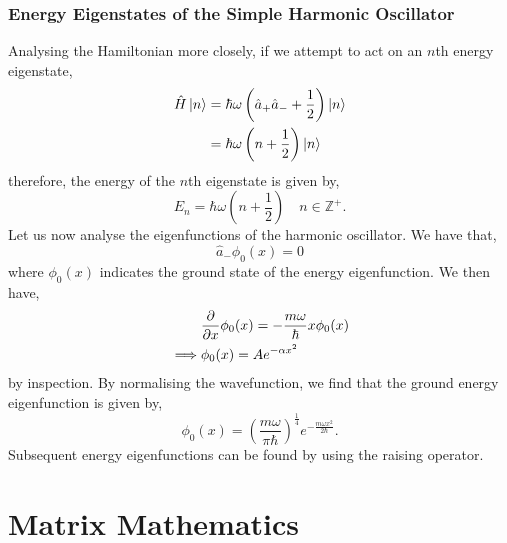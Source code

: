\documentclass{book}
\begin{document}
\subsection{Energy Eigenstates of the Simple Harmonic Oscillator}
Analysing the Hamiltonian more closely, if we attempt to act on an $n$th energy eigenstate,
\begin{equation}
	\begin{split}
	\hat{H} \ket{n} & = \hbar\omega\left(\hat{a}_+\hat{a}_- + \frac{1}{2}\right)\ket{n} \\
	& = \hbar \omega \left(n + \frac{1}{2}\right)\ket{n}
\end{split} 
\end{equation}
therefore, the energy of the $n$th eigenstate is given by,
\begin{equation}
	E_n =  \hbar\omega\left(n + \frac{1}{2}\right) \hspace{1em} n \in \mathbb{Z}^+.
\end{equation}
Let us now analyse the eigenfunctions of the harmonic oscillator. We have that,
\begin{equation}
	\hat{a}_-\phi_0(x) = 0
\end{equation}
where $\phi_0(x)$ indicates the ground state of the energy eigenfunction. We then have,
\begin{equation}
	\begin{split}
	& \pdv{x} \phi_0(x) = -\frac{m\omega}{\hbar}x\phi_0(x) \\
	\implies & \phi_0(x) = Ae^{-\alpha x^2}
\end{split}
\end{equation}
by inspection. By normalising the wavefunction, we find that the ground energy eigenfunction is given by,
\begin{equation}
	\phi_0(x) = \left(\frac{m\omega}{\pi \hbar}\right)^{\frac{1}{4}} e^{-\frac{m\omega x^2}{2\hbar}}.
\end{equation}
Subsequent energy eigenfunctions can be found by using the raising operator.
\appendix
\chapter {Matrix Mathematics}
\end{document}
